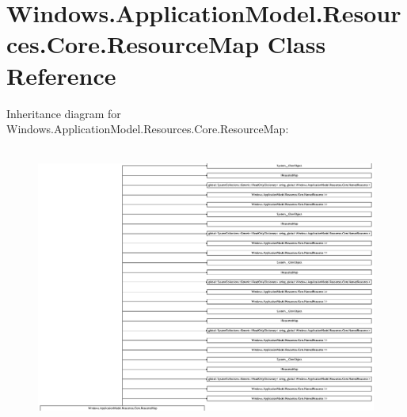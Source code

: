 \hypertarget{class_windows_1_1_application_model_1_1_resources_1_1_core_1_1_resource_map}{}\section{Windows.\+Application\+Model.\+Resources.\+Core.\+Resource\+Map Class Reference}
\label{class_windows_1_1_application_model_1_1_resources_1_1_core_1_1_resource_map}
Inheritance diagram for Windows.\+Application\+Model.\+Resources.\+Core.\+Resource\+Map\+:\begin{figure}[H]
\begin{center}
\leavevmode
\includegraphics[height=9.273885cm]{class_windows_1_1_application_model_1_1_resources_1_1_core_1_1_resource_map}
\end{center}
\end{figure}
